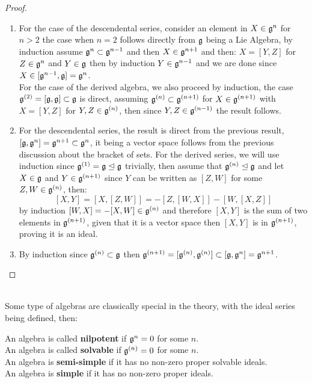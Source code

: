 \begin{proof}
	\begin{enumerate}[label=(\alph*)]
		\item For the case of the descendental series, consider an element in $X \in \mathfrak{g}^n$ for $n > 2$ the case when $n=2$ follows directly from $\mathfrak{g}$ being a Lie Algebra, by induction assume $\mathfrak{g}^{n}\subset \mathfrak{g}^{n-1}$ and then $X \in \mathfrak{g}^{n+1}$ and then: $X=[Y,Z]$ for $Z \in \mathfrak{g}^{n}$ and $Y \in \mathfrak{g}$ then by induction $Y\in \mathfrak{g}^{n-1}$ and we are done since $X \in [\mathfrak{g}^{n-1},\mathfrak{g}] = \mathfrak{g}^{n}$.\\
		For the case of the derived algebra, we also proceed by induction, the case $\mathfrak{g}^{(2)} = [\mathfrak{g},\mathfrak{g}] \subset \mathfrak{g}$ is direct, assuming $\mathfrak{g}^{(n)} \subset \mathfrak{g}^{(n+1)}$ for $X \in \mathfrak{g}^{(n+1)}$ with $X=[Y,Z]$ for $Y,Z \in \mathfrak{g}^{(n)}$, then since $Y,Z \in \mathfrak{g}^{(n-1)}$ the result follows.\\
	\item For the descendental series, the result is direct from the previous result, $[\mathfrak{g},\mathfrak{g}^n] = \mathfrak{g}^{n+1} \subset \mathfrak{g}^n$, it being a vector space follows from the previous discussion about the bracket of sets. For the derived series, we will use induction since $\mathfrak{g}^{(1)}=\mathfrak{g} \trianglelefteq \mathfrak{g}$ trivially, then assume that $\mathfrak{g}^{(n)} \trianglelefteq \mathfrak{g}$ and let $X \in \mathfrak{g}$ and $Y \in \mathfrak{g}^{(n+1)}$ since $Y$ can be written as $[Z,W]$ for some $Z,W \in \mathfrak{g}^{(n)}$, then:
	$$[X,Y] = [X,[Z,W]] = -[Z,[W,X]]-[W,[X,Z]] $$ 
	by induction $[W,X] = -[X,W] \in \mathfrak{g}^{(n)}$ and therefore $[X,Y]$ is the sum of two elements in $\mathfrak{g}^{(n+1)}$, given that it is a vector space then $[X,Y]$ is in $\mathfrak{g}^{(n+1)}$, proving it is an ideal.
	\item By induction since $\mathfrak{g}^{(n)}\subset \mathfrak{g}$ then $\mathfrak{g}^{(n+1)} = [\mathfrak{g}^{(n)},\mathfrak{g}^{(n)}] \subset [\mathfrak{g},\mathfrak{g}^n] = \mathfrak{g}^{n+1}$.
	\end{enumerate}
\end{proof}\\
Some type of algebras are classically special in the theory, with the ideal series being defined, then:
\begin{defi}

 An algebra is called \textbf{nilpotent} if $\mathfrak{g}^n = 0$ for some $n$.\\
 An algebra is called \textbf{solvable} if $\mathfrak{g}^{(n)}=0$ for some $n$.\\
 An algebra is \textbf{semi-simple} if it has no non-zero proper solvable ideals.\\
 An algebra is \textbf{simple} if it has no non-zero proper ideals.

\label{algebratypes}
\end{defi}